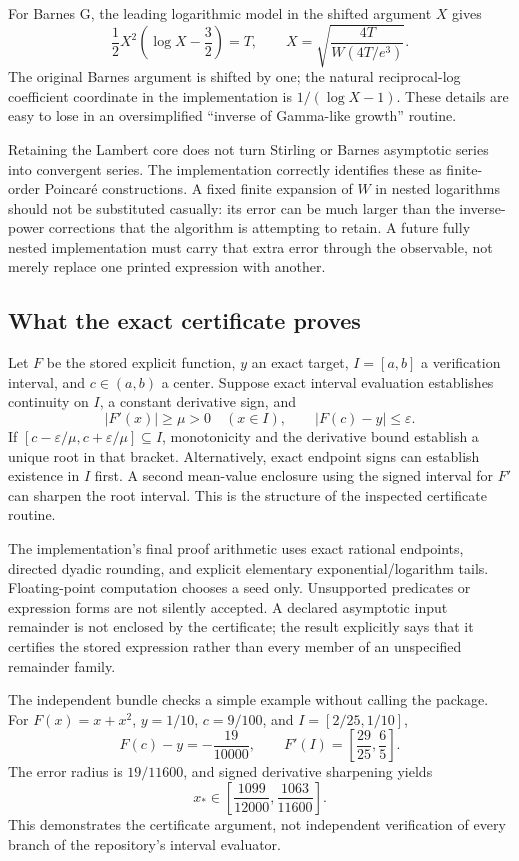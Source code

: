 For Barnes G, the leading logarithmic model in the shifted argument $X$ gives
\[
 \frac12X^2\left(\log X-\frac32\right)=T,
 \qquad X=\sqrt{\frac{4T}{W(4T/e^3)}}.
\]
The original Barnes argument is shifted by one; the natural reciprocal-log coefficient coordinate in the implementation is $1/(\log X-1)$. These details are easy to lose in an oversimplified ``inverse of Gamma-like growth'' routine.\cite{gamma,dlmf-barnes}

Retaining the Lambert core does not turn Stirling or Barnes asymptotic series into convergent series. The implementation correctly identifies these as finite-order Poincar\'e constructions. A fixed finite expansion of $W$ in nested logarithms should not be substituted casually: its error can be much larger than the inverse-power corrections that the algorithm is attempting to retain. A future fully nested implementation must carry that extra error through the observable, not merely replace one printed expression with another.\cite{gamma,dlmf-gamma,dlmf-barnes}

\subsection{What the exact certificate proves}
Let $F$ be the stored explicit function, $y$ an exact target, $I=[a,b]$ a verification interval, and $c\in(a,b)$ a center. Suppose exact interval evaluation establishes continuity on $I$, a constant derivative sign, and
\[
 |F'(x)|\ge\mu>0\quad(x\in I),\qquad |F(c)-y|\le\varepsilon.
\]
If $[c-\varepsilon/\mu,c+\varepsilon/\mu]\subseteq I$, monotonicity and the derivative bound establish a unique root in that bracket. Alternatively, exact endpoint signs can establish existence in $I$ first. A second mean-value enclosure using the signed interval for $F'$ can sharpen the root interval. This is the structure of the inspected certificate routine.\cite{certificates}

The implementation's final proof arithmetic uses exact rational endpoints, directed dyadic rounding, and explicit elementary exponential/logarithm tails. Floating-point computation chooses a seed only. Unsupported predicates or expression forms are not silently accepted. A declared asymptotic input remainder is not enclosed by the certificate; the result explicitly says that it certifies the stored expression rather than every member of an unspecified remainder family.\cite{certificates}

The independent bundle checks a simple example without calling the package. For $F(x)=x+x^2$, $y=1/10$, $c=9/100$, and $I=[2/25,1/10]$,
\[
 F(c)-y=-\frac{19}{10000},\qquad F'(I)=\left[\frac{29}{25},\frac65\right].
\]
The error radius is $19/11600$, and signed derivative sharpening yields
\[
 x_*\in\left[\frac{1099}{12000},\frac{1063}{11600}\right].
\]
This demonstrates the certificate argument, not independent verification of every branch of the repository's interval evaluator.
